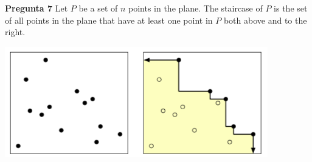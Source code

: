 \textbf{Pregunta 7}
Let $P$ be a set of $n$ points in the plane. The staircase of $P$ is the set of all points
in the plane that have at least one point in $P$ both above and to the right.
\begin{center}
    \includegraphics[scale=0.5]{escalera1}
\end{center}

